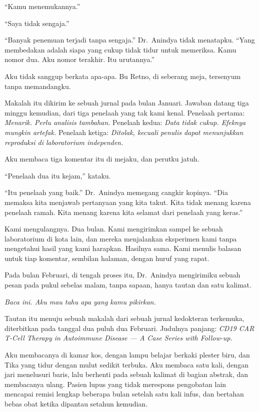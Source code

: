 \documentclass[11pt,twoside,openany]{book}
\makeatletter
\newcommand{\scenebreak}{\par\vspace{0.9em}{\centering\textsc{*\hspace{0.7em}*\hspace{0.7em}*}\par}\vspace{0.9em}\@afterindentfalse\@afterheading}
\makeatother
\begin{document}
``Kamu menemukannya.''

``Saya tidak sengaja.''

``Banyak penemuan terjadi tanpa sengaja.'' Dr.~Anindya tidak menatapku. ``Yang membedakan adalah siapa yang cukup tidak tidur untuk memeriksa. Kamu nomor dua. Aku nomor terakhir. Itu urutannya.''

Aku tidak sanggup berkata apa-apa. Bu Retno, di seberang meja, tersenyum tanpa memandangku.

Makalah itu dikirim ke sebuah jurnal pada bulan Januari. Jawaban datang tiga minggu kemudian, dari tiga penelaah yang tak kami kenal. Penelaah pertama: \emph{Menarik. Perlu analisis tambahan.} Penelaah kedua: \emph{Data tidak cukup. Efeknya mungkin artefak.} Penelaah ketiga: \emph{Ditolak, kecuali penulis dapat menunjukkan reproduksi di laboratorium independen.}

Aku membaca tiga komentar itu di mejaku, dan perutku jatuh.

``Penelaah dua itu kejam,'' kataku.

``Itu penelaah yang baik.'' Dr.~Anindya memegang cangkir kopinya. ``Dia memaksa kita menjawab pertanyaan yang kita takut. Kita tidak menang karena penelaah ramah. Kita menang karena kita selamat dari penelaah yang keras.''

Kami mengulangnya. Dua bulan. Kami mengirimkan sampel ke sebuah laboratorium di kota lain, dan mereka menjalankan eksperimen kami tanpa mengetahui hasil yang kami harapkan. Hasilnya sama. Kami menulis balasan untuk tiap komentar, sembilan halaman, dengan huruf yang rapat.

\scenebreak
Pada bulan Februari, di tengah proses itu, Dr.~Anindya mengirimiku sebuah pesan pada pukul sebelas malam, tanpa sapaan, hanya tautan dan satu kalimat.

\emph{Baca ini. Aku mau tahu apa yang kamu pikirkan.}

Tautan itu menuju sebuah makalah dari sebuah jurnal kedokteran terkemuka, diterbitkan pada tanggal dua puluh dua Februari. Judulnya panjang: \emph{CD19 CAR T-Cell Therapy in Autoimmune Disease --- A Case Series with Follow-up.}

Aku membacanya di kamar kos, dengan lampu belajar berkaki plester biru, dan Tika yang tidur dengan mulut sedikit terbuka. Aku membaca satu kali, dengan jari menelusuri baris, lalu berhenti pada sebuah kalimat di bagian abstrak, dan membacanya ulang. Pasien lupus yang tidak merespons pengobatan lain mencapai remisi lengkap beberapa bulan setelah satu kali infus, dan bertahan bebas obat ketika dipantau setahun kemudian.
\end{document}
